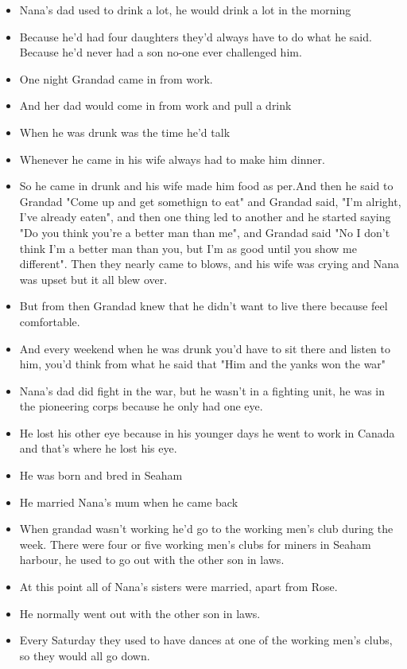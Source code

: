 \documentclass[10pt,twocolumn,letterpaper]{article}
\begin{document}
\begin{itemize}
    \item Nana's dad used to drink a lot, he would drink a lot in the morning
    \item Because he'd had four daughters they'd always have to do what he said. Because he'd never had a son no-one ever challenged him.
    \item One night Grandad came in from work.
    \item And her dad would come in from work and pull a drink
    \item When he was drunk was the time he'd talk
    \item Whenever he came in his wife always had to make him dinner.
    \item So he came in drunk and his wife made him food as per.And then he said to Grandad "Come up and get somethign to eat" and Grandad said, "I'm alright, I've already eaten", and then one thing led to another and he started saying "Do you think you're a better man than me", and Grandad said "No I don't think I'm a better man than you, but I'm as good until you show me different". Then they nearly came to blows, and his wife was crying and Nana was upset but it all blew over.
    \item But from then Grandad knew that he didn't want to live there because feel comfortable.
    \item And every weekend when he was drunk you'd have to sit there and listen to him, you'd think from what he said that "Him and the yanks won the war"
    \item Nana's dad did fight in the war, but he wasn't in a fighting unit, he was in the pioneering corps because he only had one eye.
    \item He lost his other eye because in his younger days he went to work in Canada and that's where he lost his eye.
    \item He was born and bred in Seaham
    \item He married Nana's mum when he came back
    \item When grandad wasn't working he'd go to the working men's club during the week. There were four or five working men's clubs for miners in Seaham harbour, he used to go out with the other son in laws.
    \item At this point all of Nana's sisters were married, apart from Rose.
    \item He normally went out with the other son in laws.
    \item Every Saturday they used to have dances at one of the working men's clubs, so they would all go down.

\end{itemize}
\end{document}
